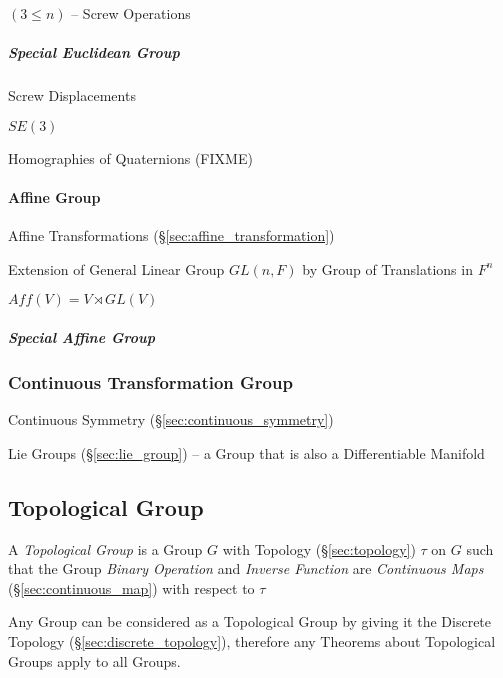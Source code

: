 $(3 \leq n)$ -- Screw Operations



\subparagraph{Special Euclidean Group}\label{sec:special_euclidean}\hfill

Screw Displacements

$SE(3)$

Homographies of Quaternions (FIXME)



\paragraph{Affine Group}\label{sec:affine_group}\hfill

Affine Transformations (\S\ref{sec:affine_transformation})

Extension of General Linear Group $GL(n,F)$ by Group of Translations in $F^n$

$Aff(V) = V \rtimes GL(V)$



\subparagraph{Special Affine Group}\label{sec:special_affine_group}\hfill



\subsubsection{Continuous Transformation Group}
\label{sec:continuous_transformation_group}

Continuous Symmetry (\S\ref{sec:continuous_symmetry})

Lie Groups (\S\ref{sec:lie_group}) -- a Group that is also a
Differentiable Manifold



\subsection{Topological Group}\label{sec:topological_group}

A \emph{Topological Group} is a Group $G$ with Topology (\S\ref{sec:topology})
$\tau$ on $G$ such that the Group \emph{Binary Operation} and \emph{Inverse
  Function} are \emph{Continuous Maps} (\S\ref{sec:continuous_map})
with respect to $\tau$

Any Group can be considered as a Topological Group by giving it the Discrete
Topology (\S\ref{sec:discrete_topology}), therefore any Theorems about
Topological Groups apply to all Groups.

